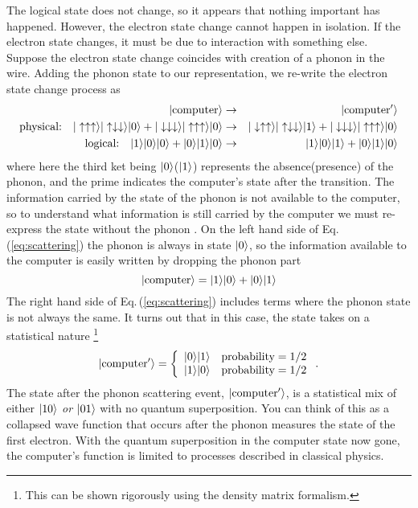 The logical state does not change, so it appears that nothing important has happened.
However, the electron state change cannot happen in isolation.
If the electron state changes, it must be due to interaction with something else.
Suppose the electron state change coincides with creation of a phonon in the wire.
Adding the phonon state to our representation, we re-write the electron state change process as \begin{eqnarray}
|\text{computer}\rangle & \rightarrow & |\text{computer}'\rangle \nonumber \\
\text{physical:}\quad |\uparrow \uparrow \uparrow\rangle|\uparrow \downarrow \downarrow\rangle|0\rangle + |\downarrow \downarrow \downarrow\rangle|\uparrow \uparrow \uparrow\rangle|0\rangle & \rightarrow & |\downarrow \uparrow \uparrow\rangle|\uparrow \downarrow \downarrow\rangle|1\rangle + |\downarrow \downarrow \downarrow\rangle|\uparrow \uparrow \uparrow\rangle|0\rangle \nonumber \\
\text{logical:} \quad |1\rangle|0\rangle|0\rangle + |0\rangle|1\rangle|0\rangle & \rightarrow & |1\rangle|0\rangle|1\rangle + |0\rangle|1\rangle|0\rangle \label{eq:scattering} \end{eqnarray}
where here the third ket being $|0\rangle$($|1\rangle$) represents the absence(presence) of the phonon, and the prime indicates the computer's state after the transition.
The information carried by the state of the phonon is not available to the computer, so to understand what information is still carried by the computer we must re-express the state without the phonon .
On the left hand side of Eq.\,(\ref{eq:scattering}) the phonon is always in state $|0\rangle$, so the information available to the computer is easily written by dropping the phonon part \begin{equation}
|\text{computer}\rangle = |1\rangle|0\rangle + |0\rangle|1\rangle \end{equation}
The right hand side of Eq.\,(\ref{eq:scattering}) includes terms where the phonon state is not always the same.
It turns out that in this case, the state takes on a statistical nature \footnote{This can be shown rigorously using the density matrix formalism.} \begin{equation}
|\text{computer}'\rangle = \left\{ \begin{array}{c}
|0\rangle|1\rangle \quad \text{probability}= 1/2 \\
|1\rangle|0\rangle \quad \text{probability}= 1/2 \end{array} \right. . \end{equation}
The state after the phonon scattering event, $|\text{computer}'\rangle$, is a statistical mix of either $|10\rangle$ \emph{or} $|01\rangle$ with no quantum superposition.
You can think of this as a collapsed wave function that occurs after the phonon measures the state of the first electron.
With the quantum superposition in the computer state now gone, the computer's function is limited to processes described in classical physics.

